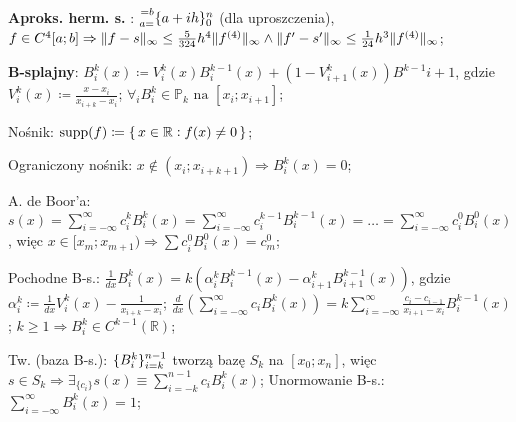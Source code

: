 \entry
\textbf{Aproks. herm. s. \mancube}:
$\ipoints[0][n][a=][=b]{a+ih}$
(dla uproszczenia),
$
f\in C^{4}[a;b]
\Rightarrow
\|f-s\|_\infty \leq \frac{5}{324} h^4 \|f^{(4)}\|_\infty
\wedge
\|f'-s'\|_\infty \leq \frac{1}{24} h^3 \|f^{(4)}\|_\infty
$;


\entry
\textbf{B-splajny}:
$B_i^k(x) \coloneqq V_i^k(x) B_i^{k-1}(x) + (1 - V^k_{i+1}(x)) B^{k-1}{i+1}$,
gdzie
$V_i^k(x) \coloneqq \frac{x-x_i}{x_{i+k} - x_i}$;
\entry
$\forall_i B_i^k \in \mathbb{P}_{k} \text{ na } [x_i; x_{i+1}]$;


\entry
Nośnik:
$\mathrm{supp}(f) \coloneqq \set{x \in \mathbb{R}: f(x) \neq 0}$;

\entry
Ograniczony nośnik:
$x \notin (x_i; x_{i+k+1}) \Rightarrow B^k_i(x)=0$;

\entry
A. de Boor'a:
$
s(x) =
\sum_{i=-\infty}^{\infty} c_i^k B^k_i (x) =
\sum_{i=-\infty}^{\infty} c_i^{k-1} B^{k-1}_i (x) =
\ldots =
\sum_{i=-\infty}^{\infty} c_i^{0} B^{0}_i (x)
$,
więc
$x\in [x_m; x_{m+1}) \Rightarrow \sum c^0_i B^0_i(x) = c_m^0$;

\entry
Pochodne B-s.:
$\frac{1}{dx}B_i^k(x) = k (\alpha^k_i B_i^{k-1}(x) - \alpha^k_{i+1} B^{k-1}_{i+1}(x))$,
gdzie
$\alpha_i^k \coloneqq \frac{1}{dx}V_i^k(x) - \frac{1}{x_{i+k} - x_i}$;
\entry
$
\frac{d}{dx}(\sum_{i = -\infty}^\infty c_i B_i^k(x) ) =
k \sum_{i = -\infty}^\infty \frac{ c_i - c_{i-1} }{ x_{i+1} - x_i } B^{k-1}_i(x)
$;
\entry
$k \geq 1 \Rightarrow B_i^k \in C^{k-1}(\mathbb{R})$;

\entry
Tw. (baza B-s.):
$\ipoints[i=k][n-1]{B_i^k}$
tworzą bazę $S_k$ na $[x_0; x_n]$,
więc
$s \in S_k \Rightarrow \exists_{\{c_i\}} s(x) \equiv \sum_{i=-k}^{n-1} c_i B_i^k(x)$;
\entry
Unormowanie B-s.:
$\sum_{i = -\infty}^\infty B_i^k(x) = 1$;

